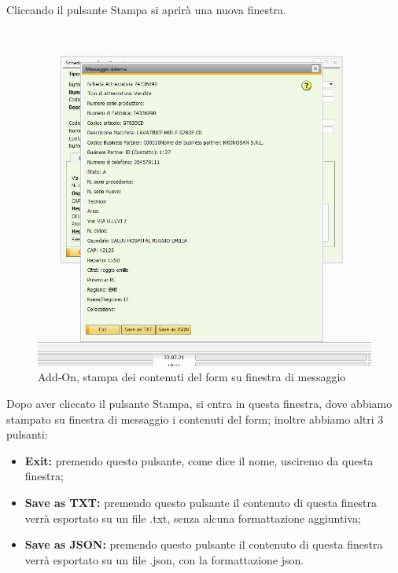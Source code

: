 \newpage

\vspace{1em}

Cliccando il pulsante Stampa si aprirà una nuova finestra.

\begin{figure}[!h] 
	\centering 
	\includegraphics[scale = 0.6]{immagini/add-on/addon-stampa.jpg} 
	\caption{Add-On, stampa dei contenuti del form su finestra di messaggio}
\end{figure}
\begin{flushleft}
	
	Dopo aver cliccato il pulsante Stampa, si entra in questa finestra, dove abbiamo stampato su finestra di messaggio i contenuti del form; inoltre abbiamo altri 3 pulsanti:
\end{flushleft}
\begin{itemize}
	\item \textbf{Exit:} premendo questo pulsante, come dice il nome, usciremo da questa finestra;
	\item \textbf{Save as TXT:} premendo questo pulsante il contenuto di questa finestra verrà esportato su un file .txt, senza alcuna formattazione aggiuntiva;
	\item \textbf{Save as JSON:} premendo questo pulsante il contenuto di questa finestra verrà esportato su un file .json, con la formattazione json.
\end{itemize}

